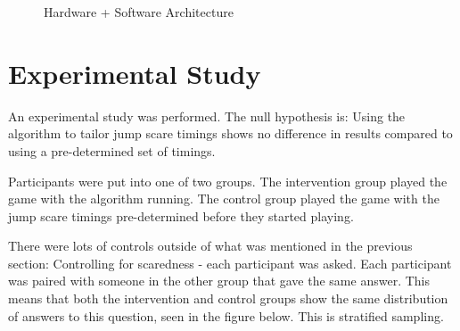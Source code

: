 \documentclass[12pt,a4paper]{article}\usepackage[]{graphicx}\usepackage[]{color}
\begin{document}
\begin{figure}[!htbp]
	\centering
	\caption{Hardware + Software Architecture}
\end{figure}

\section{Experimental Study}

An experimental study was performed.
The null hypothesis is: Using the algorithm to tailor jump scare timings shows no difference in results compared to using a pre-determined set of timings.

Participants were put into one of two groups.
The intervention group played the game with the algorithm running.
The control group played the game with the jump scare timings pre-determined before they started playing.

There were lots of controls outside of what was mentioned in the previous section:
Controlling for scaredness - each participant was asked.
Each participant was paired with someone in the other group that gave the same answer.
This means that both the intervention and control groups show the same distribution of answers to this question, seen in the figure below.
This is stratified sampling.
\end{document}
